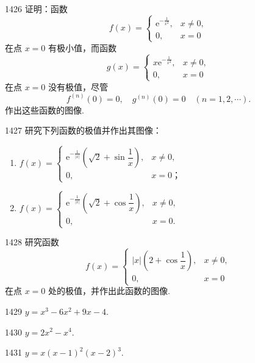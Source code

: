 \begin{prob}[L]{1426}
证明：函数
\[
f(x) = \begin{cases}
\mathrm{e}^{-\frac{1}{x^2}}, & x \neq 0, \\
0, & x = 0
\end{cases}
\]
在点 $x = 0$ 有极小值，而函数
\[
g(x) = \begin{cases}
x\mathrm{e}^{-\frac{1}{x^2}}, & x \neq 0, \\
0, & x = 0
\end{cases}
\]
在点 $x = 0$ 没有极值，尽管
\[
f^{(n)}(0) = 0, \quad g^{(n)}(0) = 0 \quad (n = 1, 2, \cdots).
\]
作出这些函数的图像.
\end{prob}

\begin{prob}[L]{1427}
研究下列函数的极值并作出其图像：
\begin{enumerate}[label=(\alph*), itemsep=2pt, topsep=3pt]
    \item $f(x) = \begin{cases} \mathrm{e}^{-\frac{1}{|x|}}\left(\sqrt{2} + \sin\dfrac{1}{x}\right), & x \neq 0, \\ 0, & x = 0\text{；} \end{cases}$
    \item $f(x) = \begin{cases} \mathrm{e}^{-\frac{1}{|x|}}\left(\sqrt{2} + \cos\dfrac{1}{x}\right), & x \neq 0, \\ 0, & x = 0. \end{cases}$
\end{enumerate}
\end{prob}

\begin{prob}[M]{1428}
研究函数
\[
f(x) = \begin{cases}
|x|\left(2 + \cos\dfrac{1}{x}\right), & x \neq 0, \\
0, & x = 0
\end{cases}
\]
在点 $x = 0$ 处的极值，并作出此函数的图像.
\end{prob}


\begin{prob}[S]{1429}
$y = x^3 - 6x^2 + 9x - 4$.
\end{prob}

\begin{prob}[S]{1430}
$y = 2x^2 - x^4$.
\end{prob}

\begin{prob}[S]{1431}
$y = x(x - 1)^2 (x - 2)^3$.
\end{prob}

